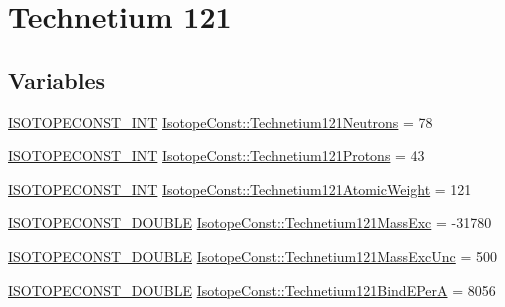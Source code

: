\hypertarget{group___isotope_const-_technetium-_tc121}{}\section{Technetium 121}
\label{group___isotope_const-_technetium-_tc121}
\subsection*{Variables}
\begin{DoxyCompactItemize}
\item 
\mbox{\hyperlink{group___isotope_const-_macros_ga5f18360b3e99483a35c32d789e62621c}{I\+S\+O\+T\+O\+P\+E\+C\+O\+N\+S\+T\+\_\+\+I\+NT}} \mbox{\hyperlink{group___isotope_const-_technetium-_tc121_gae17963d89fa3baa3e0f1fa33acca9ef6}{Isotope\+Const\+::\+Technetium121\+Neutrons}} = 78
\item 
\mbox{\hyperlink{group___isotope_const-_macros_ga5f18360b3e99483a35c32d789e62621c}{I\+S\+O\+T\+O\+P\+E\+C\+O\+N\+S\+T\+\_\+\+I\+NT}} \mbox{\hyperlink{group___isotope_const-_technetium-_tc121_gaaf7321fb8ff0ea17a1a24c8c55e7e668}{Isotope\+Const\+::\+Technetium121\+Protons}} = 43
\item 
\mbox{\hyperlink{group___isotope_const-_macros_ga5f18360b3e99483a35c32d789e62621c}{I\+S\+O\+T\+O\+P\+E\+C\+O\+N\+S\+T\+\_\+\+I\+NT}} \mbox{\hyperlink{group___isotope_const-_technetium-_tc121_gae6f9afdb5edf36ad4dd1d2d959d34924}{Isotope\+Const\+::\+Technetium121\+Atomic\+Weight}} = 121
\item 
\mbox{\hyperlink{group___isotope_const-_macros_ga8f45a7272ce02c0b4c65c44636ed719a}{I\+S\+O\+T\+O\+P\+E\+C\+O\+N\+S\+T\+\_\+\+D\+O\+U\+B\+LE}} \mbox{\hyperlink{group___isotope_const-_technetium-_tc121_ga3b4ea639922aaa1aabdae50cb863ebe4}{Isotope\+Const\+::\+Technetium121\+Mass\+Exc}} = -\/31780
\item 
\mbox{\hyperlink{group___isotope_const-_macros_ga8f45a7272ce02c0b4c65c44636ed719a}{I\+S\+O\+T\+O\+P\+E\+C\+O\+N\+S\+T\+\_\+\+D\+O\+U\+B\+LE}} \mbox{\hyperlink{group___isotope_const-_technetium-_tc121_ga4fa447e0b8b6880b5b94f74e8ee73a46}{Isotope\+Const\+::\+Technetium121\+Mass\+Exc\+Unc}} = 500
\item 
\mbox{\hyperlink{group___isotope_const-_macros_ga8f45a7272ce02c0b4c65c44636ed719a}{I\+S\+O\+T\+O\+P\+E\+C\+O\+N\+S\+T\+\_\+\+D\+O\+U\+B\+LE}} \mbox{\hyperlink{group___isotope_const-_technetium-_tc121_gafc4e0083eff4c672e1495c38c741bf5c}{Isotope\+Const\+::\+Technetium121\+Bind\+E\+PerA}} = 8056
\item 

\end{DoxyCompactItemize}
